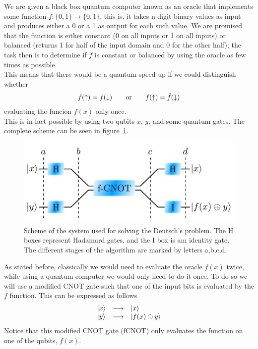 We are given a black box quantum computer known as an oracle that implements some function $f:\{ 0,1\}\rightarrow\{ 0,1\}$, this is, it takes n-digit binary values as input and produces either a 0 or a 1 as output for each such value. We are promised that the function is either constant (0 on all inputs or 1 on all inputs) or balanced (returns 1 for half of the input domain and 0 for the other half); the task then is to determine if $f$ is constant or balanced by using the oracle as few times as possible. \\

This means that there would be a quantum speed-up if we could distinguish whether
\begin{equation}
  f(\uparrow) = f(\downarrow) \quad\quad \text{or}\quad\quad f(\uparrow) = \tilde{f}(\downarrow)
  \label{problem}
\end{equation}
evaluating the funcion $f(x)$ only once.\\

This is in fact possible by using two qubits $x$, $y$, and some quantum gates. The complete scheme can be seen in figure~\ref{fcnot}.
\begin{figure}[!h]
  \centering
  \includegraphics{chapter02/figures/fcnot.pdf}
  \vspace{-5pt}
  \caption{Scheme of the system used for solving the Deutsch's problem. The H boxes represent Hadamard gates, and the I box is am identity gate. The different stages of the algorithm are marked by letters a,b,c,d.}
  \label{fcnot}
\end{figure}
\FloatBarrier
As stated before, classically we would need to evaluate the oracle $f(x)$ twice, while using a quantum computer we would only need to do it once. To  do so we will use a modified CNOT gate such that one of the input bits is evaluated by the $f$ function. This can be expressed as follows
\begin{equation}
  \begin{array}{lcl}
    |x\rangle & \longrightarrow & |x\rangle \\
    |y\rangle & \longrightarrow & |f(x)\oplus y\rangle
  \end{array}
  \label{fCNOT}
\end{equation}
Notice that this modified CNOT gate (fCNOT) only evaluates the function on one of the qubits, $f(x)$.\\


